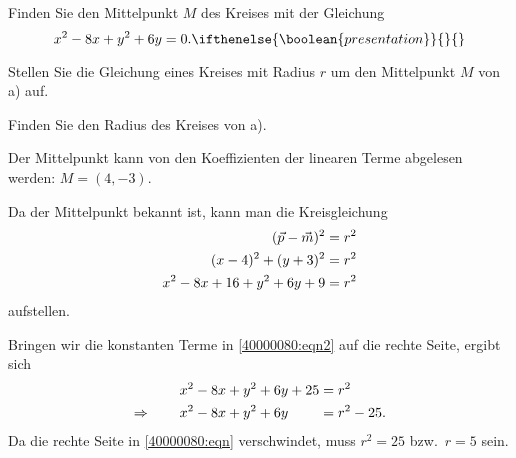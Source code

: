 \begin{teilaufgaben}
\item
Finden Sie den Mittelpunkt $M$ des Kreises mit der Gleichung
\begin{equation}
x^2-8x+y^2+6y=0.
\ifthenelse{\boolean{presentation}}{\notag}{
\label{40000080:eqn}
}
\end{equation}
\item
Stellen Sie die Gleichung eines Kreises mit Radius $r$ um den
Mittelpunkt $M$ von a) auf.
\item
Finden Sie den Radius des Kreises von a).
\end{teilaufgaben}

\begin{loesung}
\begin{teilaufgaben}
\item
Der Mittelpunkt kann von den Koeffizienten der linearen Terme
abgelesen werden: $M=(4,-3)$.
\item
Da der Mittelpunkt bekannt ist, kann man die Kreisgleichung
\begin{align}
(\vec{p}-\vec{m})^2&= r^2
\notag
\\
(x-4)^2 + (y+3)^2 &= r^2
\notag
\\
x^2-8x+16 + y^2 + 6y + 9 &= r^2
\label{40000080:eqn2}
\end{align}
aufstellen.
\item
Bringen wir die konstanten Terme in 
\eqref{40000080:eqn2}
auf die rechte Seite, ergibt sich
\begin{align*}
x^2-8x + y^2 + 6y + 25 &= r^2
\\
\Rightarrow\qquad
x^2-8x + y^2 + 6y \phantom{\mathstrut+25} &= r^2-25.
\end{align*}
Da die rechte Seite in \eqref{40000080:eqn} verschwindet, muss
$r^2=25$ bzw.~$r=5$ sein.
\qedhere
\end{teilaufgaben}
\end{loesung}

